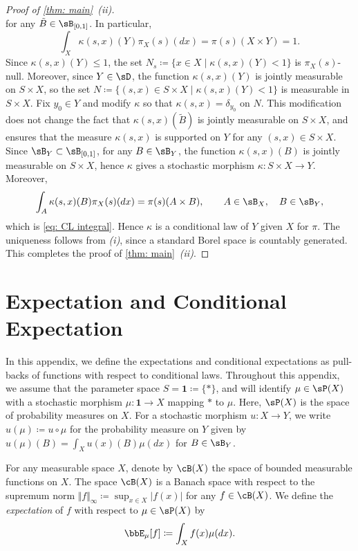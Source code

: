 \documentclass[12pt,reqno]{amsart}%
\theoremstyle{plain}
\theoremstyle{definition}
\def\abs#1{|#1|}
\def\dabs#1{\Vert#1\Vert}
\def\bsone{\boldsymbol{1}}
\begin{document}
\begin{proof}[Proof of \cref{thm: main}~\textit{(ii)}]
\[	\]
	for any $\tilde B\in\sB_{[0,1]}$.
	In particular,
	\[
		\int_X \kappa(s,x)(Y)\pi_X(s)(dx)=\pi(s)(X\times Y)=1.
	\]
	Since $\kappa(s,x)(Y)\leq 1$, the set $N_s\coloneqq\{x \in X \mid \kappa(s,x)(Y)<1\}$ is
	$\pi_X(s)$-null.
	Moreover, since $Y\in\sD$, the function $\kappa(s,x)(Y)$ is jointly measurable on $S\times X$,
	so the set $N\coloneqq\{(s,x) \in S\times X \mid \kappa(s,x)(Y)<1\}$ is measurable in $S\times X$.
	Fix $y_0\in Y$ and modify $\kappa$ so that $\kappa(s,x)=\delta_{y_0}$ on $N$.
	This modification
	does not change the fact that $\kappa(s,x)(\tilde B)$ is jointly measurable on $S\times X$, and
	ensures that the measure $\kappa(s,x)$ is supported on $Y$ for any $(s,x)\in S\times X$.
	Since $\sB_Y\subset\sB_{[0,1]}$, for any $B\in\sB_Y$,
	the function $\kappa(s,x)(B)$ is jointly measurable on $S\times X$,
	hence $\kappa$ gives a stochastic morphism $\kappa\colon S\times X\rightarrow Y$.
	Moreover,
	\[
		\int_A \kappa(s,x)(B)\pi_X(s)(dx)=\pi(s)(A\times B),\qquad A\in\sB_X, \quad B\in\sB_Y,
	\]
	which is \eqref{eq: CL integral}.  Hence $\kappa$ is a conditional law of $Y$ given $X$ for $\pi$.
	The uniqueness follows from \textit{(i)}, since a standard Borel space is countably generated.
	This completes the proof of \cref{thm: main}~\textit{(ii)}.
\end{proof}

%
%
%
\section{Expectation and Conditional Expectation}\label{sec: appendix B}
%
%
%

In this appendix, we define the expectations and conditional expectations
as pull-backs of functions with respect to conditional laws.
Throughout this appendix, we assume that the parameter space $S=\bsone\coloneqq\{*\}$,
and will identify $\mu\in\sP(X)$ with a stochastic morphism $\mu\colon\bsone\rightarrow X$
mapping $*$ to $\mu$.  Here, $\sP(X)$ is the space of probability measures on $X$.
For a stochastic morphism $u\colon X\rightarrow Y$, we write $u(\mu)\coloneqq u\circ\mu$
for the probability measure on $Y$ given by $u(\mu)(B)=\int_Xu(x)(B)\mu(dx)$ for $B\in\sB_Y$.

For any measurable space $X$, denote by $\cB(X)$ the space of bounded measurable functions on $X$.
The space $\cB(X)$ is a Banach space with respect to the supremum
norm $\dabs{f}_\infty\coloneqq\sup_{x\in X}\abs{f(x)}$
for any $f\in\cB(X)$.  We define the \emph{expectation} of $f$ with respect to $\mu\in\sP(X)$ by
\[
	\bbE_\mu[f]\coloneqq\int_Xf(x)\mu(dx).
\]
\end{document}
